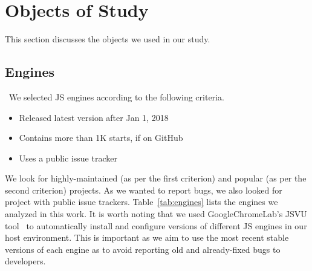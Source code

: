 \documentclass[10pt,conference,anonymous]{IEEEtran}
\begin{document}

\section{Objects of Study}
\label{sec:methodology}

This section discusses the objects we used in our study.

\subsection{Engines}
\label{sec:methodology:engines}~We selected 
JS engines according to the following criteria.

\begin{itemize}
\item Released latest version after Jan 1, 2018
\item Contains more than 1K starts, if on GitHub  
\item Uses a public issue tracker
\end{itemize}  

We look for highly-maintained (as per the first criterion) and popular
(as per the second criterion) projects. As we wanted to report bugs,
we also looked for project with public issue
trackers. Table~\ref{tab:engines} lists the engines we analyzed in
this work. It is worth noting that we used GoogleChromeLab's JSVU
tool~\cite{jsvu} to automatically install and configure versions of
different JS engines in our host environment. This is important as we
aim to use the most recent stable versions of each engine as to avoid
reporting old and already-fixed bugs to developers.

\end{document}
